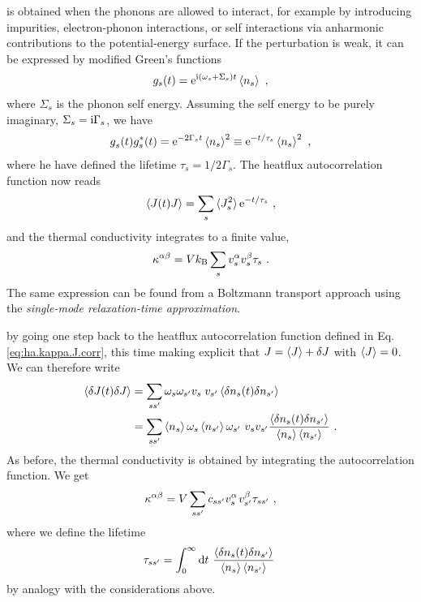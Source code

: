  is obtained when the phonons are allowed to interact, for example by introducing impurities, electron-phonon interactions, or self interactions via anharmonic contributions to the potential-energy surface. If the perturbation is weak, it can be expressed by modified Green's functions
\begin{align}
	g_s (t) = {\rm e}^{\im \left( \omega_s + \Sigma_s \right) t} \braket{n_s}~,
	\label{eq:ha.kappa.g.self}
\end{align}
where $\Sigma_s$ is the phonon self energy. Assuming the self energy to be purely imaginary, $\Sigma_s = {\rm i} \Gamma_s$, we have
\begin{align}
	\fD g_s (t) g^\ast_{s} (t) = {\rm e}^{- 2 \Gamma_s t} \braket{n_s}^2
	\equiv {\rm e}^{-t / \tau_s} \braket{n_s}^2~,
	\label{eq:ha.kappa.gg.Sigma}
\end{align}
where he have defined the lifetime $\tau_s = 1 / 2 \Gamma_s$. The heatflux autocorrelation function now reads
\begin{align}
	\braket{J (t) J} = \sum_s \braket{J_s^2} {\rm e}^{-t / \tau_s}~,
	\label{eq:ha.kappa.JJ.pert}
\end{align}
and the thermal conductivity integrates to a finite value,
\begin{align}
	\kappa^{\alpha \beta} = V k_{\rm B} \sum_{s} v^\alpha_s v^\beta_s \tau_s~.
	\label{eq:ha.kappa.bte}
\end{align}
The same expression can be found from a Boltzmann transport approach using the \emph{single-mode relaxation-time approximation}.

 by going one step back to the heatflux autocorrelation function defined in Eq.\,\eqref{eq:ha.kappa.J.corr}, this time making explicit that $J = \braket{J} + \delta J$ with $\braket{J} = 0$. We can therefore write
\begin{align}
	\braket{\delta J(t)  \delta J} 
		&= \sum_{ss'} \omega_s \omega_{s'} v_{\fP s} v_{s'}
	\braket{\delta n_s (t) \delta n_{s'}} \\
	&= \sum_{ss'} \braket{n_s} \omega_s \braket{n_{s'}} \omega_{s'} ~ v_{s} v_{s'}
	\frac{\braket{\delta n_s (t) \delta n_{s'}}}{\braket{n_s} \braket{n_{s'}}}
	~.
\label{eq:ha.kappa.dJ.corr}
\end{align}
As before, the thermal conductivity is obtained by integrating the autocorrelation function. We get
\begin{align}
	\kappa^{\alpha \beta}
		= V \sum_{ss'} c_{ss'} v^\alpha_{\fP s} v^\beta_{s'} \tau_{ss'}~,
\end{align}
where we define the lifetime
\begin{align}
	\tau_{ss'} 
		=	\int_{0}^{\infty} \d t ~ \frac{\braket{\delta n_s (t) \delta n_{s'}}}{\braket{n_s} \braket{n_{s'}}}~
	\label{eq:lifetime.md}
\end{align}
by analogy with the considerations above.

